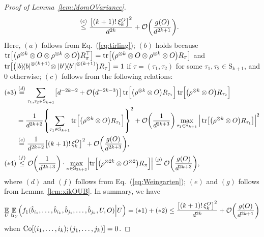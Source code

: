 \documentclass[aps,prl,twocolumn,nofootinbib,superscriptaddress,10pt]{revtex4-2}
\let\originalleft\left
\let\originalright\right
\renewcommand{\left}{\mathopen{}\mathclose\bgroup\originalleft}
\renewcommand{\right}{\aftergroup\egroup\originalright}
\def\E{ {\mathbb E} } %
\newcommand{\ketbra}[2]{\ensuremath{\left|#1\right\rangle\!\left\langle#2\right|}}
\DeclareMathOperator{\Tr}{tr}
\newcommand{\bigo}[1]{\mathcal{O}\left(#1\right)}
\theoremstyle{plain}
\theoremstyle{definition}
\newcommand{\eref}[1]{Eq.~\textup{(\ref{#1})}}
\newcommand{\lref}[1]{Lemma~\ref{#1}}
\begin{document}
\begin{proof}[Proof of \lref{lem:MomOVariance}]
\begin{align}
&\stackrel{(c)}{\leq}
\frac{\left[ (k+1)!\,\xi_k^{O}\right]^2}{d^{2k}} +\bigo{\frac{g(O)}{d^{2k+1}} }.
\end{align}
Here,
$(a)$ follows from \eref{eq:tirling}; 
$(b)$ holds because $\Tr \left[ \left( \rho^{\otimes k} \otimes O\otimes\rho^{\otimes k} \otimes O \right) R_{\pi}^{\top} \right] =\Tr\left[  \left( \rho^{\otimes k} \otimes O\otimes\rho^{\otimes k} \otimes O \right) R_{\pi}\right]$ and  
$\Tr\!\big[ \big( \ketbra{b}{b}^{\otimes (k+1)}\!\otimes \ketbra{b'}{b'}^{\otimes (k+1)}\big) R_{\tau} \big]=1$ if $\tau=(\tau_1,\tau_2)$ for some $\tau_1,\tau_2\in\mathrm{S}_{k+1}$, and 0 otherwise; 
$(c)$ follows from the following relations: 
\begin{align}\label{eq:EEfcasee}
(*3)&\stackrel{(d)}{=}
\sum_{\tau_1,\tau_2\in \mathrm{S}_{k+1}}
\left[ d^{-2k-2}+ \bigo{d^{-2k-3}}\right]  
\Tr\!\Big[ \left( \rho^{\otimes k} \otimes O \right) R_{\tau_1} \Big]
\Tr\!\Big[ \left( \rho^{\otimes k} \otimes O \right) R_{\tau_2} \Big]
\nonumber\\
&=\frac{1}{d^{2k+2}}  \left\lbrace \sum_{\tau_1\in \mathrm{S}_{k+1}}
\Tr\!\Big[ \left( \rho^{\otimes k} \otimes O \right) R_{\tau_1} \Big] \right\rbrace^2
+\bigo{\frac{1}{d^{2k+3}}} 
\max_{\tau_1\in \mathrm{S}_{k+1}}
\Big| \Tr\!\big[ \left( \rho^{\otimes k} \otimes O \right) R_{\tau_1} \big] \Big|^2 
\nonumber\\ 
&\stackrel{(e)}{=}\frac{1}{d^{2k+2}} \left[ (k+1)!\,\xi_k^{O}\right]^2 +\bigo{\frac{g(O)}{d^{2k+3}} },
\\ 
(*4)&\stackrel{(f)}{\leq}
\bigo{\frac{1}{d^{2k+3}}} \cdot 
\max_{\pi\in\mathrm{S}_{2k+2}}\left| \Tr\!\Big[ \left( \rho^{\otimes 2k} \otimes O^{\otimes 2} \right) R_{\pi} \Big]\right|
\stackrel{(g)}{=}
\bigo{\frac{g(O)}{d^{2k+3}} },
\end{align}
where $(d)$ and $(f)$ follows from \eref{eq:Weingarten}; 
$(e)$ and $(g)$ follows from \lref{lem:xikOUB}. 
In summary, we have 
\begin{align}\label{eq:EEfcasef}
\underset{U }{\E} \, \underset{\,\mathbf{b}_{U}}{\E} \Big(
f_1(\hat{b}_{i_1},\dots,\hat{b}_{i_k},\hat{b}_{j_1},\dots,\hat{b}_{j_k}, U,O)\Big| U \Big)
=(*1)+(*2)\leq 
\frac{\left[ (k+1)!\,\xi_k^{O}\right]^2}{d^{2k}} +\bigo{\frac{g(O)}{d^{2k+1}}}
\end{align}
when ${\rm Co}[(i_1,\dots,i_k);(j_1,\dots,j_k)]=0$. 


\end{proof}
\end{document}
